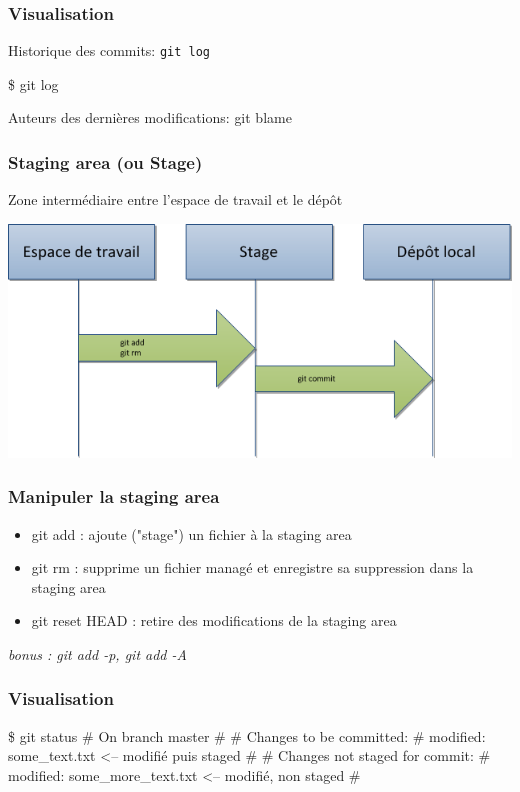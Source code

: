 \begin{frame}[fragile]\frametitle{Visualisation}
  Historique des commits: \verb|git log|

  \begin{semiverbatim}
  \$ \alert{git log}
  \end{semiverbatim}


  Auteurs des dernières modifications: \alert{git blame}
\end{frame}
\begin{frame}\frametitle{Staging area (ou Stage)}
  Zone intermédiaire entre l'espace de travail et le dépôt
  \begin{center}
    \includegraphics[width=\textwidth]{./images/staging-area.png}
  \end{center}

\end{frame}
\begin{frame}[fragile]\frametitle{Manipuler la staging area}
  \begin{itemize}
    \item \alert{git add} : ajoute ("stage") un fichier à la staging area
    \item \alert{git rm} : supprime un fichier managé et enregistre sa suppression
      dans la staging area
    \item \alert{git reset HEAD} : retire des modifications de la staging area
  \end{itemize}

  \textit{bonus : git add -p, git add -A}

\end{frame}
\begin{frame}[fragile]\frametitle{Visualisation}

\begin{semiverbatim}

  \$ \alert{git status}
  # On branch master
  #
  # Changes to be committed:
  #
  modified: some_text.txt \alert{ <-- modifié puis staged}
  #
  # Changes not staged for commit:
  #
  modified: some_more_text.txt \alert{ <-- modifié, non staged}
  #
  \end{semiverbatim}
\end{frame}
  
